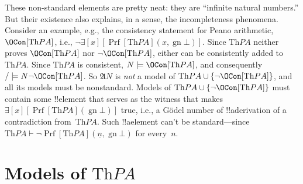 \documentclass[10pt,a4paper]{article}
\theoremstyle{plain}
\theoremstyle{definition}
\theoremstyle{remark}
\newcommand*{\olfileid}[3]{}
\newcommand*{\olchapter}[3]{}
\newcommand*{\olimport}[1]{}
\providecommand{\lexists}{\mathord{\exists}}
\providecommand{\lfalse}{\bot}
\providecommand{\Proves}{\mathrel{\vdash}}
\providecommand{\Struct}{\ensuremath{\mathfrak{A}}}
\providecommand{\Sat}[2]{\ensuremath{#1 \models #2}}
\providecommand{\Th}{\ensuremath{\mathrm{Th}}}
\providecommand{\num}[1]{\underline{#1}}
\providecommand{\gn}{\operatorname{gn}}
\providecommand{\OPrf}{\operatorname{Prf}}
\begin{document}
These non-standard elements are pretty neat: they are ``infinite
natural numbers.'' But their existence also explains, in a sense, the
incompleteness phenomena.  Consider an example, e.g., the consistency
statement for Peano arithmetic, $\OCon[\Th{PA}]$, i.e., $\lnot
\lexists[x][\OPrf[\Th{PA}](x, \gn{\lfalse})]$. Since $\Th{PA}$ neither
proves $\OCon[\Th{PA}]$ nor $\lnot \OCon[\Th{PA}]$, either can be
consistently added to $\Th{PA}$. Since $\Th{PA}$ is consistent,
$\Sat{N}{\OCon[\Th{PA}]}$, and consequently $\Sat/{N}{\lnot
  \OCon[\Th{PA}]}$.  So $\Struct{N}$ is \emph{not} a model of $\Th{PA}
\cup \{\lnot \OCon[\Th{PA}]\}$, and all its models must be
nonstandard. Models of $\Th{PA} \cup \{\lnot \OCon[\Th{PA}]\}$ must
contain some !!{element} that serves as the witness that makes
$\lexists[x][\OPrf[\Th{PA}](\gn{\lfalse})]$ true, i.e., a G\"odel
number of !!a{derivation} of a contradiction from~$\Th{PA}$.  Such
!!a{element} can't be standard---since $\Th{PA} \Proves \lnot
\OPrf[\Th{PA}](\num{n}, \gn{\lfalse})$ for every~$n$.





\olchapter{mod}{mar}{Models of Arithmetic}

\olimport{introduction}

\olimport{standard-models}

\olimport{non-standard-models}

\olimport{models-of-q}

\olimport{models-of-pa}

\olimport{computable-models}

\OLEndChapterHook





\olfileid{mod}{mar}{mpa}
\section{Models of $\Th{PA}$}
\end{document}
